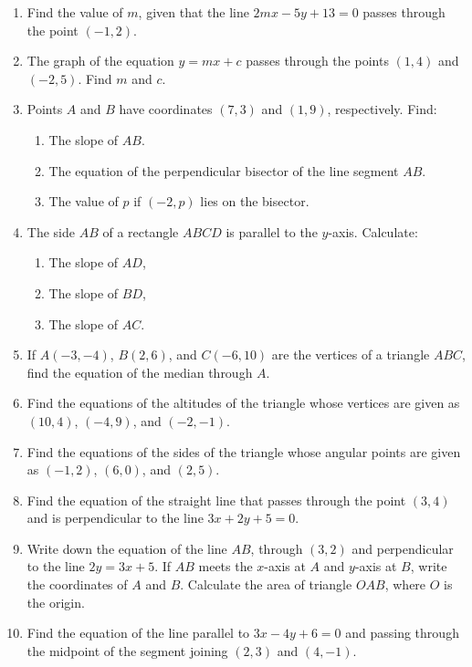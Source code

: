 \documentclass[12pt]{article}
\begin{document}
\begin{multicols}{2}
\begin{enumerate}
		\item Find the value of \( m \), given that the line \( 2mx - 5y + 13 = 0 \) passes through the point \( (-1, 2) \).
		\item The graph of the equation \( y = mx + c \) passes through the points \( (1, 4) \) and \( (-2, 5) \). Find \( m \) and \( c \).
		\item Points \( A \) and \( B \) have coordinates \( (7, 3) \) and \( (1, 9) \), respectively. Find:
		\begin{enumerate}
			\item The slope of \( AB \).
			\item The equation of the perpendicular bisector of the line segment \( AB \).
			\item The value of \( p \) if \( (-2, p) \) lies on the bisector.
		\end{enumerate}
		\item The side \( AB \) of a rectangle \( ABCD \) is parallel to the \( y \)-axis. Calculate:
		\begin{enumerate}
			\item The slope of \( AD \),
			\item The slope of \( BD \),
			\item The slope of \( AC \).
		\end{enumerate}
		\item If \( A(-3, -4) \), \( B(2, 6) \), and \( C(-6, 10) \) are the vertices of a triangle \( ABC \), find the equation of the median through \( A \).
		\item Find the equations of the altitudes of the triangle whose vertices are given as \( (10, 4) \), \( (-4, 9) \), and \( (-2, -1) \).
		\item Find the equations of the sides of the triangle whose angular points are given as \( (-1, 2) \), \( (6, 0) \), and \( (2, 5) \).
		\item Find the equation of the straight line that passes through the point \( (3, 4) \) and is perpendicular to the line \( 3x + 2y + 5 = 0 \).
		\item Write down the equation of the line \( AB \), through \( (3, 2) \) and perpendicular to the line \( 2y = 3x + 5 \). If \( AB \) meets the \( x \)-axis at \( A \) and \( y \)-axis at \( B \), write the coordinates of \( A \) and \( B \). Calculate the area of triangle \( OAB \), where \( O \) is the origin.
		\item Find the equation of the line parallel to \( 3x - 4y + 6 = 0 \) and passing through the midpoint of the segment joining \( (2, 3) \) and \( (4, -1) \).

\end{enumerate}
\end{multicols}
\end{document}
